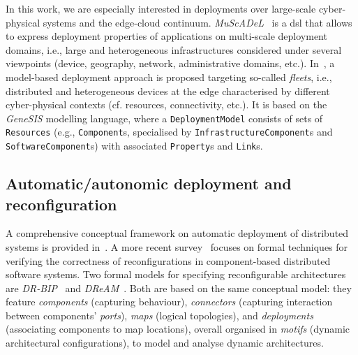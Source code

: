 \documentclass[conference]{IEEEtran}
\newcommand{\meta}[1]{{\color{blue}#1}}
\begin{document}
In this work,
 we are especially interested in deployments over large-scale cyber-physical systems and the edge-cloud continuum.
%
\emph{MuScADeL}~\cite{DBLP:conf/compsac/BoujbelRLTAL14/muscadel}
 is a \ac{dsl} that allows to express deployment properties of 
applications on multi-scale deployment domains,
i.e., large and heterogeneous infrastructures considered under several viewpoints
(device, geography, network, administrative domains, etc.).
%
In~\cite{DBLP:journals/sosym/SongDFSF22},
  a model-based deployment approach is proposed
  targeting so-called \emph{fleets}, i.e.,
  distributed and heterogeneous devices at the edge characterised by different cyber-physical contexts
(cf. resources, connectivity, etc.).
%
It is based on the \emph{GeneSIS} modelling language,
where a \texttt{DeploymentModel} consists of sets of \texttt{Resources} (e.g., \texttt{Component}s, specialised by \texttt{InfrastructureComponent}s and \texttt{SoftwareComponent}s) with associated \texttt{Property}s and \texttt{Link}s.

\subsection{Automatic/autonomic deployment and reconfiguration}
\label{sec:rw:autodep}
%
A comprehensive conceptual framework
 on automatic deployment of distributed systems
 is provided in~\cite{DBLP:journals/jss/ArcangeliBL15}.
%
A more recent survey~\cite{coullon2023swreconfig} focuses
 on formal techniques for verifying the correctness of reconfigurations
 in component-based distributed software systems.
%
Two formal models for specifying reconfigurable architectures are
\emph{DR-BIP}~\cite{Ballouli18dr-bip}
and \emph{DReAM}~\cite{denicola2020dream-dynamic-reconfig-arch-modelling}.
%
Both are based on the same conceptual model: they 
 feature \emph{components} (capturing behaviour),
\emph{connectors} (capturing interaction between components' \emph{ports}),
\emph{maps} (logical topologies),
and \emph{deployments} (associating components to map locations),
overall organised in \emph{motifs} (dynamic architectural configurations),
to model and analyse dynamic architectures.
%
\end{document}

